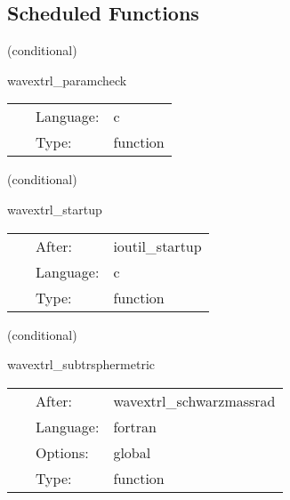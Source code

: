\documentclass{article}
\begin{document}
\subsection*{Scheduled Functions}
\vspace{5mm}

   (conditional) 

\hspace{5mm} wavextrl\_paramcheck 

\hspace{5mm}{\it check parameters for waveextract } 


\hspace{5mm}

 \begin{tabular*}{160mm}{cll} 
~ & Language:  & c \\ 
~ & Type:  & function \\ 
\end{tabular*} 


\vspace{5mm}

   (conditional) 

\hspace{5mm} wavextrl\_startup 

\hspace{5mm}{\it register waveextract as an io method } 


\hspace{5mm}

 \begin{tabular*}{160mm}{cll} 
~ & After:  & ioutil\_startup \\ 
~ & Language:  & c \\ 
~ & Type:  & function \\ 
\end{tabular*} 


\vspace{5mm}

   (conditional) 

\hspace{5mm} wavextrl\_subtrsphermetric 

\hspace{5mm}{\it substract spherical background part of metric from metric } 


\hspace{5mm}

 \begin{tabular*}{160mm}{cll} 
~ & After:  & wavextrl\_schwarzmassrad \\ 
~ & Language:  & fortran \\ 
~ & Options:  & global \\ 
~ & Type:  & function \\ 
\end{tabular*} 
\end{document}
